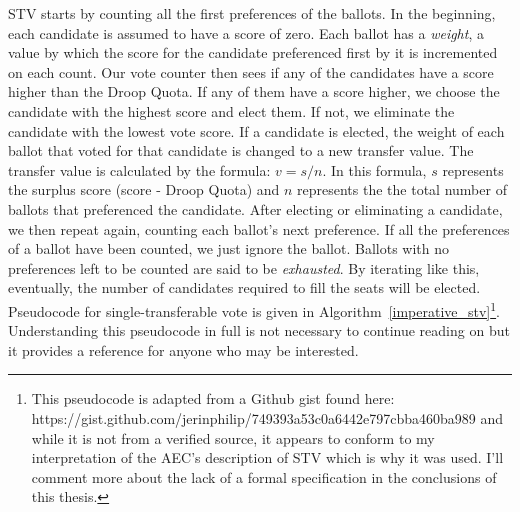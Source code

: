 STV starts by counting all the first preferences of the ballots. In the
beginning, each candidate is assumed to have a score of zero. Each ballot has a
\textit{weight}, a value by which the score for the candidate preferenced first
by it is incremented on each count. Our vote counter then sees if any of the
candidates have a score higher than the Droop Quota. If any of them have a score
higher, we choose the candidate with the highest score and elect them. If not,
we eliminate the candidate with the lowest vote score. If a candidate is
elected, the weight of each ballot that voted for that candidate is changed to a
new transfer value. The transfer value is calculated by the formula: $v = s/n$.
In this formula, $s$ represents the surplus score (score - Droop Quota) and $n$
represents the the total number of ballots that preferenced the candidate. After
electing or eliminating a candidate, we then repeat again, counting each
ballot's next preference. If all the preferences of a ballot have been counted,
we just ignore the ballot. Ballots with no preferences left to be counted are
said to be \textit{exhausted}. By iterating like this, eventually, the number of
candidates required to fill the seats will be elected. Pseudocode for
single-transferable vote is given in
Algorithm~\ref{imperative_stv}\footnote{This pseudocode is adapted from a Github
gist found here:\\
https://gist.github.com/jerinphilip/749393a53c0a6442e797cbba460ba989 and while
it is not from a verified source, it appears to conform to my interpretation of
the AEC's description of STV which is why it was used. I'll comment more about
the lack of a formal specification in the conclusions of this thesis.}.
Understanding this pseudocode in full is not necessary to continue reading on
but it provides a reference for anyone who may be interested. 


